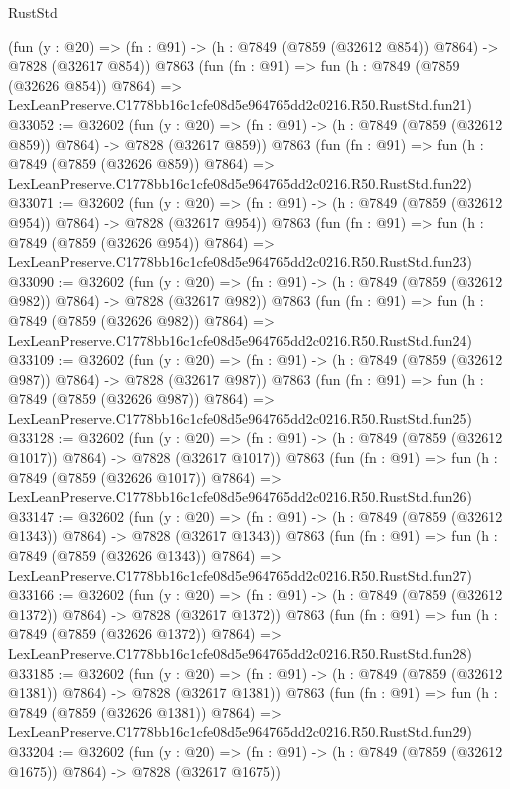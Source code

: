 \begin{lexlean}{RustStd}
\begin{coremodule}
    (fun (y : @20) => (fn : @91) -> (h : @7849 (@7859 (@32612 @854)) @7864) -> @7828 (@32617 @854))
    @7863
    (fun (fn : @91) =>
    fun (h : @7849 (@7859 (@32626 @854)) @7864) =>
    LexLeanPreserve.C1778bb16c1cfe08d5e964765dd2c0216.R50.RustStd.fun21)
@33052 := @32602
    (fun (y : @20) => (fn : @91) -> (h : @7849 (@7859 (@32612 @859)) @7864) -> @7828 (@32617 @859))
    @7863
    (fun (fn : @91) =>
    fun (h : @7849 (@7859 (@32626 @859)) @7864) =>
    LexLeanPreserve.C1778bb16c1cfe08d5e964765dd2c0216.R50.RustStd.fun22)
@33071 := @32602
    (fun (y : @20) => (fn : @91) -> (h : @7849 (@7859 (@32612 @954)) @7864) -> @7828 (@32617 @954))
    @7863
    (fun (fn : @91) =>
    fun (h : @7849 (@7859 (@32626 @954)) @7864) =>
    LexLeanPreserve.C1778bb16c1cfe08d5e964765dd2c0216.R50.RustStd.fun23)
@33090 := @32602
    (fun (y : @20) => (fn : @91) -> (h : @7849 (@7859 (@32612 @982)) @7864) -> @7828 (@32617 @982))
    @7863
    (fun (fn : @91) =>
    fun (h : @7849 (@7859 (@32626 @982)) @7864) =>
    LexLeanPreserve.C1778bb16c1cfe08d5e964765dd2c0216.R50.RustStd.fun24)
@33109 := @32602
    (fun (y : @20) => (fn : @91) -> (h : @7849 (@7859 (@32612 @987)) @7864) -> @7828 (@32617 @987))
    @7863
    (fun (fn : @91) =>
    fun (h : @7849 (@7859 (@32626 @987)) @7864) =>
    LexLeanPreserve.C1778bb16c1cfe08d5e964765dd2c0216.R50.RustStd.fun25)
@33128 := @32602
    (fun (y : @20) =>
    (fn : @91) -> (h : @7849 (@7859 (@32612 @1017)) @7864) -> @7828 (@32617 @1017))
    @7863
    (fun (fn : @91) =>
    fun (h : @7849 (@7859 (@32626 @1017)) @7864) =>
    LexLeanPreserve.C1778bb16c1cfe08d5e964765dd2c0216.R50.RustStd.fun26)
@33147 := @32602
    (fun (y : @20) =>
    (fn : @91) -> (h : @7849 (@7859 (@32612 @1343)) @7864) -> @7828 (@32617 @1343))
    @7863
    (fun (fn : @91) =>
    fun (h : @7849 (@7859 (@32626 @1343)) @7864) =>
    LexLeanPreserve.C1778bb16c1cfe08d5e964765dd2c0216.R50.RustStd.fun27)
@33166 := @32602
    (fun (y : @20) =>
    (fn : @91) -> (h : @7849 (@7859 (@32612 @1372)) @7864) -> @7828 (@32617 @1372))
    @7863
    (fun (fn : @91) =>
    fun (h : @7849 (@7859 (@32626 @1372)) @7864) =>
    LexLeanPreserve.C1778bb16c1cfe08d5e964765dd2c0216.R50.RustStd.fun28)
@33185 := @32602
    (fun (y : @20) =>
    (fn : @91) -> (h : @7849 (@7859 (@32612 @1381)) @7864) -> @7828 (@32617 @1381))
    @7863
    (fun (fn : @91) =>
    fun (h : @7849 (@7859 (@32626 @1381)) @7864) =>
    LexLeanPreserve.C1778bb16c1cfe08d5e964765dd2c0216.R50.RustStd.fun29)
@33204 := @32602
    (fun (y : @20) =>
    (fn : @91) -> (h : @7849 (@7859 (@32612 @1675)) @7864) -> @7828 (@32617 @1675))

\end{coremodule}
\end{lexlean}
